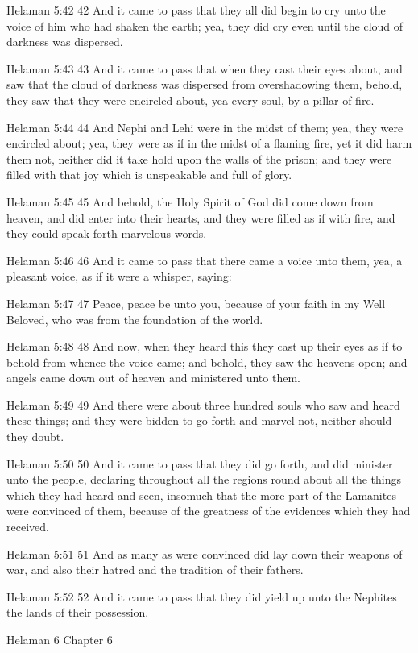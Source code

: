 Helaman 5:42
 42 And it came to pass that they all did begin to cry unto the
voice of him who had shaken the earth; yea, they did cry even
until the cloud of darkness was dispersed.

Helaman 5:43
 43 And it came to pass that when they cast their eyes about, and
saw that the cloud of darkness was dispersed from overshadowing
them, behold, they saw that they were encircled about, yea every
soul, by a pillar of fire.

Helaman 5:44
 44 And Nephi and Lehi were in the midst of them; yea, they were
encircled about; yea, they were as if in the midst of a flaming
fire, yet it did harm them not, neither did it take hold upon the
walls of the prison; and they were filled with that joy which is
unspeakable and full of glory.

Helaman 5:45
 45 And behold, the Holy Spirit of God did come down from heaven,
and did enter into their hearts, and they were filled as if with
fire, and they could speak forth marvelous words.

Helaman 5:46
 46 And it came to pass that there came a voice unto them, yea, a
pleasant voice, as if it were a whisper, saying:

Helaman 5:47
 47 Peace, peace be unto you, because of your faith in my Well
Beloved, who was from the foundation of the world.

Helaman 5:48
 48 And now, when they heard this they cast up their eyes as if
to behold from whence the voice came; and behold, they saw the
heavens open; and angels came down out of heaven and ministered
unto them.

Helaman 5:49
 49 And there were about three hundred souls who saw and heard
these things; and they were bidden to go forth and marvel not,
neither should they doubt.

Helaman 5:50
 50 And it came to pass that they did go forth, and did minister
unto the people, declaring throughout all the regions round about
all the things which they had heard and seen, insomuch that the
more part of the Lamanites were convinced of them, because of the
greatness of the evidences which they had received.

Helaman 5:51
 51 And as many as were convinced did lay down their weapons of
war, and also their hatred and the tradition of their fathers.

Helaman 5:52
 52 And it came to pass that they did yield up unto the Nephites
the lands of their possession.

Helaman 6
Chapter 6

